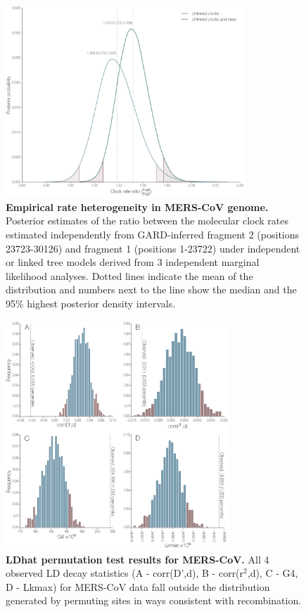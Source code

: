\documentclass[11pt,oneside,letterpaper]{article}
\begin{document}
\begin{figure}[h]
	\centering	
	\includegraphics[width=0.8\textwidth]{figures/supp_MERS_empiricalHeterogeneity.png}
	\caption{\textbf{Empirical rate heterogeneity in MERS-CoV genome.}
Posterior estimates of the ratio between the molecular clock rates estimated independently from GARD-inferred fragment 2 (positions 23723-30126) and fragment 1 (positions 1-23722) under independent or linked tree models derived from 3 independent marginal likelihood analyses.
Dotted lines indicate the mean of the distribution and numbers next to the line show the median and the 95\% highest posterior density intervals.}
	\label{rateHet}
\end{figure}

\begin{figure}[h]
	\centering	
	\includegraphics[width=0.75\textwidth]{figures/supp_MERS_permutations.png}
	\caption{\textbf{LDhat permutation test results for MERS-CoV.}
All 4 observed LD decay statistics (A - corr(D',d), B - corr(r$^{2}$,d), C - G4, D - Lkmax) for MERS-CoV data fall outside the distribution generated by permuting sites in ways consistent with recombination.}
	\label{MERS_permutations}
\end{figure}
\end{document}
